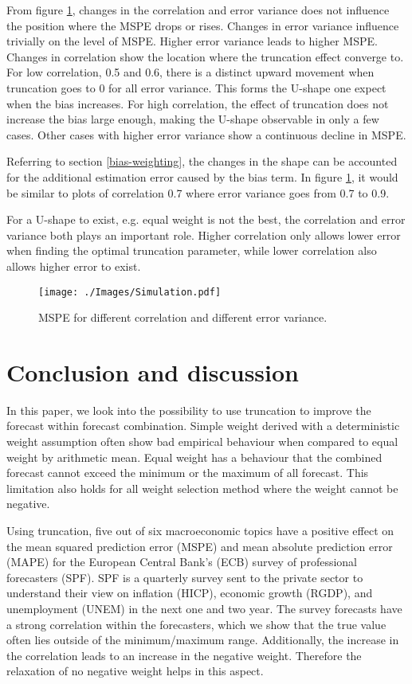 \documentclass[11pt]{article}
\begin{document}
From figure \ref{fig: simulation}, changes in the correlation and error variance does not influence the position where the MSPE drops or rises. Changes in error variance influence trivially on the level of MSPE. Higher error variance leads to higher MSPE. Changes in correlation show the location where the truncation effect converge to. For low correlation, 0.5 and 0.6, there is a distinct upward movement when truncation goes to 0 for all error variance. This forms the U-shape one expect when the bias increases. For high correlation, the effect of truncation does not increase the bias large enough, making the U-shape observable in only a few cases. Other cases with higher error variance show a continuous decline in MSPE. 

Referring to section \ref{bias-weighting}, the changes in the shape can be accounted for the additional estimation error caused by the bias term. In figure \ref{fig: simulation}, it would be similar to plots of correlation 0.7 where error variance goes from 0.7 to 0.9.

For a U-shape to exist, e.g. equal weight is not the best, the correlation and error variance both plays an important role. Higher correlation only allows lower error when finding the optimal truncation parameter, while lower correlation also allows higher error to exist.

\begin{figure}[!h]
	\centering
	\texttt{[image: ./Images/Simulation.pdf]}
	\caption{MSPE for different correlation and different error variance.}\label{fig: simulation}
\end{figure}

\section{Conclusion and discussion}\label{conclusion}
In this paper, we look into the possibility to use truncation to improve the forecast within forecast combination. Simple weight derived with a deterministic weight assumption often show bad empirical behaviour when compared to equal weight by arithmetic mean. Equal weight has a behaviour that the combined forecast cannot exceed the minimum or the maximum of all forecast. This limitation also holds for all weight selection method where the weight cannot be negative. 

Using truncation, five out of six macroeconomic topics have a positive effect on the mean squared prediction error (MSPE) and mean absolute prediction error (MAPE) for the European Central Bank's (ECB) survey of professional forecasters (SPF). SPF is a quarterly survey sent to the private sector to understand their view on inflation (HICP), economic growth (RGDP), and unemployment (UNEM) in the next one and two year. The survey forecasts have a strong correlation within the forecasters, which we show that the true value often lies outside of the minimum/maximum range. Additionally, the increase in the correlation leads to an increase in the negative weight. Therefore the relaxation of no negative weight helps in this aspect.
\end{document}
